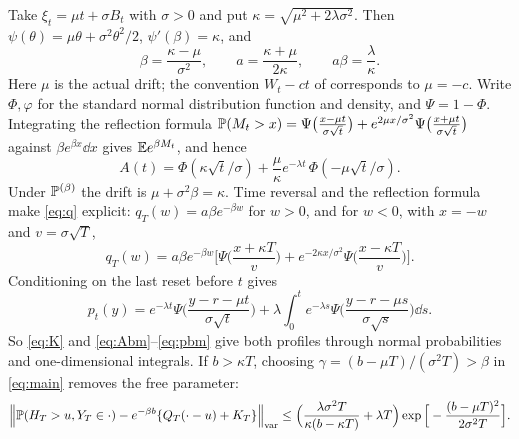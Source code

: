 \documentclass[11pt,a4paper]{article}
\begin{document}
Take $\xi_t=\mu t+\sigma B_t$ with $\sigma>0$ and put $\kappa=\sqrt{\mu^2+2\lambda\sigma^2}$. Then $\psi(\theta)=\mu\theta+\sigma^2\theta^2/2$, $\psi'(\beta)=\kappa$, and
\begin{equation}\label{eq:bm}
 \beta=\frac{\kappa-\mu}{\sigma^2},\qquad a=\frac{\kappa+\mu}{2\kappa},\qquad a\beta=\frac{\lambda}{\kappa}.
\end{equation}
Here $\mu$ is the actual drift; the convention $W_t-ct$ of \cite{DHM2026} corresponds to $\mu=-c$. Write $\Phi,\varphi$ for the standard normal distribution function and density, and $\Psi=1-\Phi$. Integrating the reflection formula $\mathbb P(M_t>x)=\Psi\big(\frac{x-\mu t}{\sigma\sqrt t}\big)+e^{2\mu x/\sigma^2}\Psi\big(\frac{x+\mu t}{\sigma\sqrt t}\big)$ against $\beta e^{\beta x}\dd x$ gives $\mathbb E e^{\beta M_t}$, and hence
\begin{equation}\label{eq:Abm}
 A(t)=\Phi(\kappa\sqrt t/\sigma)+\frac{\mu}{\kappa}e^{-\lambda t}\,\Phi(-\mu\sqrt t/\sigma).
\end{equation}
Under $\mathbb P^{(\beta)}$ the drift is $\mu+\sigma^2\beta=\kappa$. Time reversal and the reflection formula make \eqref{eq:q} explicit: $q_T(w)=a\beta e^{-\beta w}$ for $w>0$, and for $w<0$, with $x=-w$ and $v=\sigma\sqrt T$,
\begin{equation}\label{eq:qbm}
 q_T(w)=a\beta e^{-\beta w}\Big[\Psi\Big(\frac{x+\kappa T}{v}\Big)+e^{-2\kappa x/\sigma^2}\Psi\Big(\frac{x-\kappa T}{v}\Big)\Big].
\end{equation}
Conditioning on the last reset before $t$ gives
\begin{equation}\label{eq:pbm}
 p_t(y)=e^{-\lambda t}\Psi\Big(\frac{y-r-\mu t}{\sigma\sqrt t}\Big)+\lambda\int_0^te^{-\lambda s}\Psi\Big(\frac{y-r-\mu s}{\sigma\sqrt s}\Big)\dd s .
\end{equation}
So \eqref{eq:K} and \eqref{eq:Abm}--\eqref{eq:pbm} give both profiles through normal probabilities and one-dimensional integrals. If $b>\kappa T$, choosing $\gamma=(b-\mu T)/(\sigma^2T)>\beta$ in \eqref{eq:main} removes the free parameter:
\begin{equation}\label{eq:Rbm}
 \Big\|\mathbb P(H_T>u,Y_T\in\cdot)-e^{-\beta b}\{Q_T(\cdot-u)+K_T\}\Big\|_{\mathrm{var}}\le\Big(\frac{\lambda\sigma^2T}{\kappa(b-\kappa T)}+\lambda T\Big)\exp\Big[-\frac{(b-\mu T)^2}{2\sigma^2T}\Big].
\end{equation}
\end{document}
